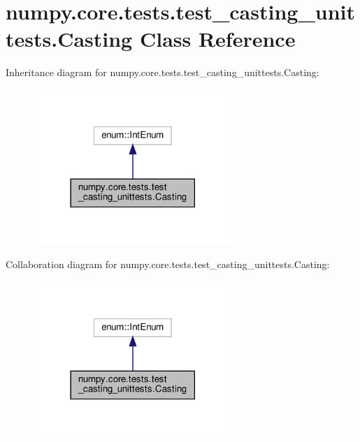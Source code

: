 \hypertarget{classnumpy_1_1core_1_1tests_1_1test__casting__unittests_1_1Casting}{}\section{numpy.\+core.\+tests.\+test\+\_\+casting\+\_\+unittests.\+Casting Class Reference}
\label{classnumpy_1_1core_1_1tests_1_1test__casting__unittests_1_1Casting}


Inheritance diagram for numpy.\+core.\+tests.\+test\+\_\+casting\+\_\+unittests.\+Casting\+:
\nopagebreak
\begin{figure}[H]
\begin{center}
\leavevmode
\includegraphics[width=213pt]{classnumpy_1_1core_1_1tests_1_1test__casting__unittests_1_1Casting__inherit__graph}
\end{center}
\end{figure}


Collaboration diagram for numpy.\+core.\+tests.\+test\+\_\+casting\+\_\+unittests.\+Casting\+:
\nopagebreak
\begin{figure}[H]
\begin{center}
\leavevmode
\includegraphics[width=213pt]{classnumpy_1_1core_1_1tests_1_1test__casting__unittests_1_1Casting__coll__graph}
\end{center}
\end{figure}
